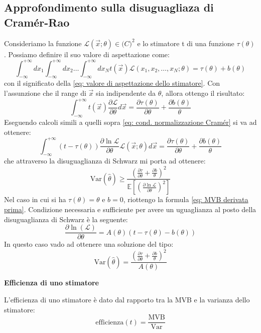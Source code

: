 \documentclass[openany,a4paper,12pt]{book}
\providecommand{\mathscr}[1]{\mathcal{#1}}
\theoremstyle{remark}
\begin{document}
\subsection*{Approfondimento sulla disuguagliaza di Cramér-Rao}
Consideriamo la funzione $\mathscr{L}(\vec{x}; \theta) \in {\mathbb(C)}^2$ e lo stimatore t di una funzione $\tau(\theta)$. Possiamo definire il suo valore di aspettazione come:
\begin{equation}
    \int_{-\infty}^{+\infty} dx_1 \int_{-\infty}^{+\infty} dx_2 \dots \int_{-\infty}^{+\infty} dx_N t(\vec{x}) \mathscr{L}(x_1, x_2, \dots, x_N; \theta) = \tau(\theta) + b(\theta)
\end{equation}
con il significato della \eqref{eq: valore di aspettazione dello stimatore}.
Con l'assunzione che il range di $\vec{x}$ sia indipendente da $\theta$, allora ottengo il risultato:
\begin{equation}
    \int_{-\infty}^{+\infty} t(\vec{x}) \frac{\partial \mathscr{L}}{\partial \theta} d\vec{x} = \frac{\partial \tau(\theta)}{\partial \theta} + \frac{\partial b(\theta)}{\theta}
\end{equation}
Eseguendo calcoli simili a quelli sopra \eqref{eq: cond. normalizzazione Cramér} si va ad ottenere:
\begin{equation}
    \int_{-\infty}^{+\infty} (t - \tau(\theta)) \frac{\partial \ln \mathscr{L}}{\partial \theta} \mathscr{L}(\vec{x}; \theta) d\vec{x} = \frac{\partial \tau(\theta)}{\partial \theta} + \frac{\partial b(\theta)}{\theta}
\end{equation}
che attraverso la disuguaglianza di Schwarz mi porta ad ottenere:
\begin{equation}
    \mathrm{Var}(\hat{\theta}) \geq \frac{{(\frac{\partial \tau}{\partial \theta} + \frac{\partial b}{\theta})}^2}{\mathbb{E}\left[ \left( \frac{\partial \ln \mathscr{L}}{\partial \theta} \right)^2 \right]}
\end{equation}
Nel caso in cui si ha $\tau(\theta)= \theta$ e $b=0$, riottengo la formula \eqref{eq: MVB derivata prima}. Condizione necessaria e sufficiente per avere un uguaglianza al posto della disuguaglianza di Schwarz è la seguente:
\begin{equation}
    \frac{\partial \ln(\mathscr{L})}{\partial \theta} = A(\theta) (t - \tau(\theta) - b(\theta))
\end{equation}
In questo caso vado ad ottenere una soluzione del tipo:
\begin{equation}
    \mathrm{Var}(\hat{\theta}) = \frac{{(\frac{\partial \tau}{\partial \theta} + \frac{\partial b}{\theta})}^2}{A(\theta)}
\end{equation}
\begin{definizione}{\textbf{Efficienza di uno stimatore}}

    L'efficienza di uno stimatore è dato dal rapporto tra la MVB e la varianza dello stimatore:
    \begin{equation*}
        \text{efficienza}(t)= \frac{\mathrm{MVB}}{\mathrm{Var}}
    \end{equation*}
\end{definizione}
\end{document}
